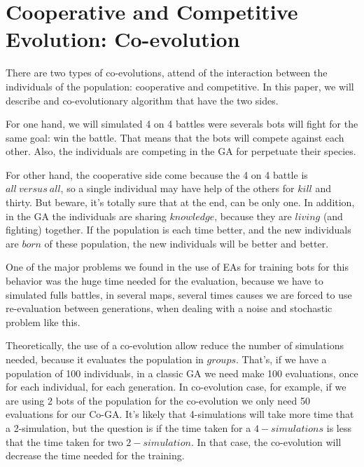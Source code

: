 \documentclass{llncs}
\begin{document}
%
\section{Cooperative and Competitive Evolution: Co-evolution}
\label{sec:co-genebot}


There are two types of co-evolutions, attend of the interaction between the individuals of the population: cooperative and competitive. In this paper, we will describe and co-evolutionary algorithm that have the two sides.

For one hand, we will simulated 4 on 4 battles were severals bots will fight for the same goal: win the battle. That means that the bots will compete against each other. Also, the individuals are competing in the GA for perpetuate their species.

For other hand, the cooperative side come because the 4 on 4 battle is {$all\ versus\ all$}, so a single individual may have help of the others for {$kill$} and thirty. But beware, it's totally sure that at the end, can be only one. In addition, in the GA the individuals are sharing {$knowledge$}, because they are {$living$} (and fighting) together. If the population is each time better, and the new individuals are {$born$} of these population, the new individuals will be better and better.

One of the major problems we found in the use of EAs for training bots for this behavior was the huge time needed for the evaluation, because we have to simulated fulls battles, in several maps, several times causes we are forced to use re-evaluation between generations, when dealing with a noise and stochastic problem like this.

Theoretically, the use of a co-evolution allow reduce the number of simulations needed, because it evaluates the population in {$groups$}. That's, if we have a population of 100 individuals, in a classic GA we need make 100 evaluations, once for each individual, for each generation. In co-evolution case, for example, if we are using 2 bots of the population for the co-evolution we only need 50 evaluations for our Co-GA. It's likely that 4-simulations will take more time that a 2-simulation, but the question is if the time taken for a {$4-simulations$} is less that the time taken for two {$2-simulation$}. In that case, the co-evolution will decrease the time needed for the training.
\end{document}

